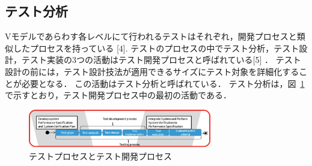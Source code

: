 \documentclass[10pt,a4j]{jarticle}
\begin{document}
\subsection{テスト分析} \label{sec:2-2}
Vモデルであらわす各レベルにて行われるテストはそれぞれ，開発プロセスと類似したプロセスを持っている [4].
テストのプロセスの中でテスト分析，テスト設計，テスト実装の3つの活動はテスト開発プロセスと呼ばれている[5] ．
テスト設計の前には，テスト設計技法が適用できるサイズにテスト対象を詳細化することが必要となる．
この活動はテスト分析と呼ばれている．
テスト分析は，図~\ref{fig:D-2-Fig2}で示すとおり，テスト開発プロセス中の最初の活動である．
\begin{figure}[h]
  \begin{center}
   \includegraphics[width=8cm]{./image/D-2-Fig2.png}
   \caption{テストプロセスとテスト開発プロセス}
   \label{fig:D-2-Fig2}
  \end{center}
\end{figure}
\end{document}
